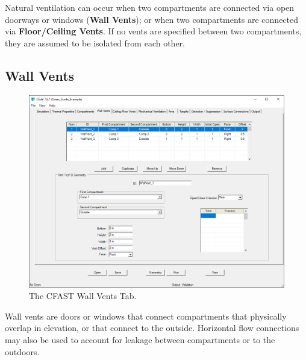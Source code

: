 Natural ventilation can occur when two compartments are connected via open doorways or windows (\textbf{Wall Vents}); or when two compartments are connected via \textbf{Floor/Ceiling Vents}. If no vents are specified between two compartments, they are assumed to be isolated from each other.

\subsection{Wall Vents}
\label{info:VENT}
\begin{figure}[h!]
\begin{center}
\includegraphics[width=6.5in]{FIGURES/Natural_Flow_Tab}
\caption[The CFAST Wall Vents Tab]{The CFAST Wall Vents Tab.}
\end{center}
\end{figure}

Wall vents are doors or windows that connect compartments that physically overlap in elevation, or that connect to the outside. Horizontal flow connections may also be used to account for leakage between compartments or to the outdoors.

